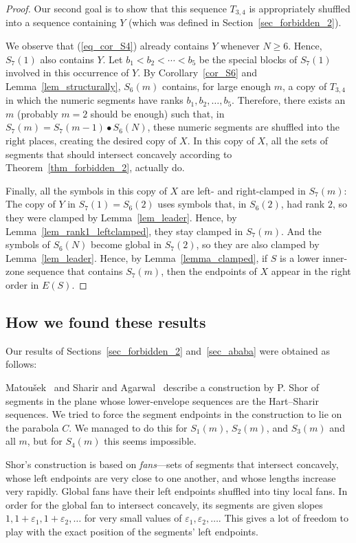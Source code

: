 \documentclass[11pt]{article}
\newcommand{\eps}{\varepsilon}
\theoremstyle{definition}
\theoremstyle{remark}
\begin{document}
\begin{proof}
Our second goal is to show that this sequence $T_{3,4}$ is appropriately shuffled into a sequence containing $Y$ (which was defined in Section~\ref{sec_forbidden_2}).

We observe that (\ref{eq_cor_S4}) already contains $Y$ whenever $N\ge 6$. Hence, $S_7(1)$ also contains $Y$. Let $b_1 < b_2 < \cdots < b_5$ be the special blocks of $S_7(1)$ involved in this occurrence of $Y$. By Corollary~\ref{cor_S6} and Lemma~\ref{lem_structurally}, $S_6(m)$ contains, for large enough $m$, a copy of $T_{3,4}$ in which the numeric segments have ranks $b_1, b_2, \ldots, b_5$. Therefore, there exists an $m$ (probably $m=2$ should be enough) such that, in $S_7(m) = S_7(m-1) \bullet S_6(N)$, these numeric segments are shuffled into the right places, creating the desired copy of $X$. In this copy of $X$, all the sets of segments that should intersect concavely according to Theorem~\ref{thm_forbidden_2}, actually do.

Finally, all the symbols in this copy of $X$ are left- and right-clamped in $S_7(m)$: The copy of $Y$ in $S_7(1) = S_6(2)$ uses symbols that, in $S_6(2)$, had rank $2$, so they were clamped by Lemma~\ref{lem_leader}. Hence, by Lemma~\ref{lem_rank1_leftclamped}, they stay clamped in $S_7(m)$. And the symbols of $S_6(N)$ become global  in $S_7(2)$, so they are also clamped by Lemma~\ref{lem_leader}. Hence, by Lemma~\ref{lemma_clamped}, if $S$ is a lower inner-zone sequence that contains $S_7(m)$, then the endpoints of $X$ appear in the right order in $E(S)$.
\end{proof}

\subsection{How we found these results}

Our results of Sections~\ref{sec_forbidden_2} and~\ref{sec_ababa} were obtained as follows:

Matou\v sek~\cite{mat_DG} and Sharir and Agarwal~\cite{DS_book} describe a construction by P. Shor of segments in the plane whose lower-envelope sequences are the Hart--Sharir sequences. We tried to force the segment endpoints in the construction to lie on the parabola $C$. We managed to do this for $S_1(m)$, $S_2(m)$, and $S_3(m)$ and all $m$, but for $S_4(m)$ this seems impossible.

Shor's construction is based on \emph{fans}---sets of segments that intersect concavely, whose left endpoints are very close to one another, and whose lengths increase very rapidly.  Global fans have their left endpoints shuffled into tiny local fans. In order for the global fan to intersect concavely, its segments are given slopes $1, 1+\eps_1, 1+\eps_2, \ldots$ for very small values of $\eps_1, \eps_2, \ldots$. This gives a lot of freedom to play with the exact position of the segments' left endpoints.
\end{document}
